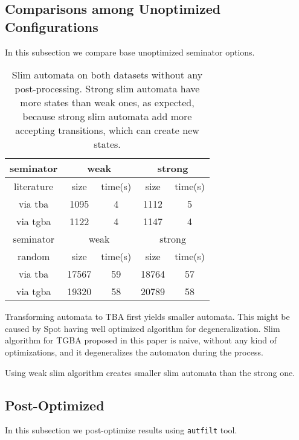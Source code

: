 \documentclass[
	digital
nolof, nolot
]{fithesis3}
\begin{document}
	\subsection{Comparisons among Unoptimized Configurations}
	In this subsection we compare base unoptimized seminator options.
\begin{table}[ht]
	\centering
	\caption{Slim automata on both datasets without any post-processing. Strong slim automata have more states than weak ones, as expected, because strong slim automata add more accepting transitions, which can create new states. }
		\begin{tabular}{ |c||c|c|c|c| } 
			\hline
			seminator&\multicolumn{2}{c|}{weak}&\multicolumn{2}{c|}{strong} \\
			\hline
			literature&size&time(s)&size&time(s)\\
			\hhline{|=====|}
			
			via tba	&	1095	&4	& 1112 	&5\\
			\hline
			via tgba&	1122	&4		&1147	&4\\ 
			\hline
			\hline
			\hline
			seminator&\multicolumn{2}{c|}{weak}&\multicolumn{2}{c|}{strong} \\
			\hhline{|=====|}
			random&size&time(s)&size&time(s)\\
			\hline
			via tba&17567&	59& 18764 &57\\
			\hline
			via tgba&19320&	58& 20789&58\\ 
			\hline
		\end{tabular}
\end{table}
	
	

	
	
	Transforming automata to TBA first yields smaller automata. This might be caused by Spot having well optimized algorithm for degeneralization. Slim algorithm for TGBA proposed in this paper is naive, without any kind of optimizations, and it degeneralizes the automaton during the process.
	
	Using weak slim algorithm creates smaller slim automata than the strong one. 

	\subsection{Post-Optimized}
	In this subsection we post-optimize results using \texttt{autfilt} tool.
	
\end{document}

